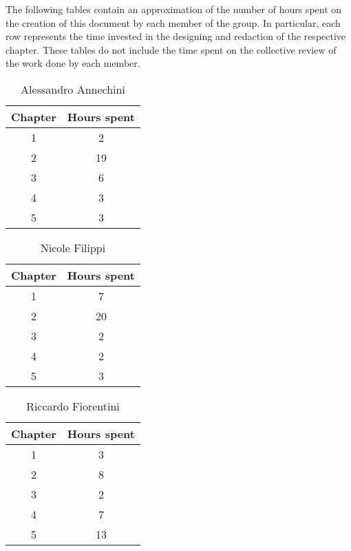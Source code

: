 The following tables contain an approximation of the number of hours spent on the creation of this document by each member of the group. In particular, each row represents the time invested in the designing and redaction of the respective chapter. These tables do not include the time spent on the collective review of the work done by each member.

\begin{table}[h!]
  \centering
  \begin{tabular}{|c|c|}
    \hline
    Chapter & Hours spent \\
    \hline
    1 & 2\\
    \hline
    2 & 19\\
    \hline
    3 & 6\\
    \hline
    4 & 3\\
    \hline
    5 & 3\\
    \hline
  \end{tabular}
  \caption{Alessandro Annechini}
  \label{tab:Alessandro_Annechini_hours}
\end{table}

\begin{table}[h!]
  \centering
  \begin{tabular}{|c|c|}
    \hline
    Chapter & Hours spent \\
    \hline
    1 & 7\\
    \hline
    2 & 20\\
    \hline
    3 & 2\\
    \hline
    4 & 2\\
    \hline
    5 & 3\\
    \hline
  \end{tabular}
  \caption{Nicole Filippi}
  \label{tab:Nicole_Filippi_hours}
\end{table}

\begin{table}[h!]
  \centering
  \begin{tabular}{|c|c|}
    \hline
    Chapter & Hours spent \\
    \hline
    1 & 3\\
    \hline
    2 & 8\\
    \hline
    3 & 2\\
    \hline
    4 & 7\\
    \hline
    5 & 13\\
    \hline
  \end{tabular}
  \caption{Riccardo Fiorentini}
  \label{tab:Riccardo_Fiorentini_hours}
\end{table}